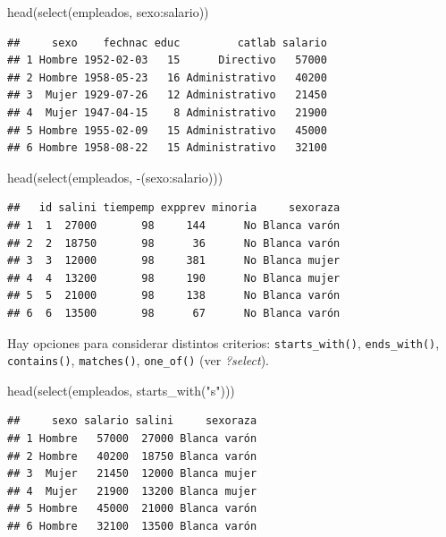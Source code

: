 \documentclass[
]{book}
\newenvironment{Shaded}{\begin{snugshade}}{\end{snugshade}}
\newcommand{\FunctionTok}[1]{\textcolor[rgb]{0.00,0.00,0.00}{#1}}
\newcommand{\NormalTok}[1]{#1}
\newcommand{\SpecialCharTok}[1]{\textcolor[rgb]{0.00,0.00,0.00}{#1}}
\newcommand{\StringTok}[1]{\textcolor[rgb]{0.31,0.60,0.02}{#1}}
\theoremstyle{break}
\theoremstyle{nonumberplain}
\begin{document}
\begin{Shaded}
\begin{Highlighting}[]
\FunctionTok{head}\NormalTok{(}\FunctionTok{select}\NormalTok{(empleados, sexo}\SpecialCharTok{:}\NormalTok{salario))}
\end{Highlighting}
\end{Shaded}

\begin{verbatim}
##     sexo    fechnac educ         catlab salario
## 1 Hombre 1952-02-03   15      Directivo   57000
## 2 Hombre 1958-05-23   16 Administrativo   40200
## 3  Mujer 1929-07-26   12 Administrativo   21450
## 4  Mujer 1947-04-15    8 Administrativo   21900
## 5 Hombre 1955-02-09   15 Administrativo   45000
## 6 Hombre 1958-08-22   15 Administrativo   32100
\end{verbatim}

\begin{Shaded}
\begin{Highlighting}[]
\FunctionTok{head}\NormalTok{(}\FunctionTok{select}\NormalTok{(empleados, }\SpecialCharTok{{-}}\NormalTok{(sexo}\SpecialCharTok{:}\NormalTok{salario)))}
\end{Highlighting}
\end{Shaded}

\begin{verbatim}
##   id salini tiempemp expprev minoria     sexoraza
## 1  1  27000       98     144      No Blanca varón
## 2  2  18750       98      36      No Blanca varón
## 3  3  12000       98     381      No Blanca mujer
## 4  4  13200       98     190      No Blanca mujer
## 5  5  21000       98     138      No Blanca varón
## 6  6  13500       98      67      No Blanca varón
\end{verbatim}

Hay opciones para considerar distintos criterios: \texttt{starts\_with()}, \texttt{ends\_with()},
\texttt{contains()}, \texttt{matches()}, \texttt{one\_of()} (ver \emph{?select}).

\begin{Shaded}
\begin{Highlighting}[]
\FunctionTok{head}\NormalTok{(}\FunctionTok{select}\NormalTok{(empleados, }\FunctionTok{starts\_with}\NormalTok{(}\StringTok{"s"}\NormalTok{)))}
\end{Highlighting}
\end{Shaded}

\begin{verbatim}
##     sexo salario salini     sexoraza
## 1 Hombre   57000  27000 Blanca varón
## 2 Hombre   40200  18750 Blanca varón
## 3  Mujer   21450  12000 Blanca mujer
## 4  Mujer   21900  13200 Blanca mujer
## 5 Hombre   45000  21000 Blanca varón
## 6 Hombre   32100  13500 Blanca varón
\end{verbatim}
\end{document}

